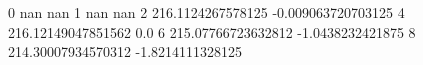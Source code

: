0 nan nan
1 nan nan
2 216.1124267578125 -0.009063720703125
4 216.12149047851562 0.0
6 215.07766723632812 -1.0438232421875
8 214.30007934570312 -1.8214111328125
